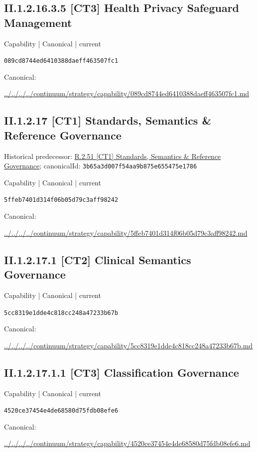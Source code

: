 \documentclass[10pt,a4paper]{article}
\begin{document}
\subsection*{II.1.2.16.3.5 [CT3] Health Privacy Safeguard Management}
\label{element-089cd8744ed6410388daeff463507fc1}
{\small Capability | Canonical | current}\par
\texttt{089cd8744ed6410388daeff463507fc1}\par
Canonical: \par
{\footnotesize\url{../../../../continuum/strategy/capability/089cd8744ed6410388daeff463507fc1.md}}\par
\subsection*{II.1.2.17 [CT1] Standards, Semantics \& Reference Governance}
Historical predecessor: \hyperref[element-3b65a3d007f54aa9b875e655475e1786]{R.2.51 [CT1] Standards, Semantics \& Reference Governance}; canonicalId: \texttt{3b65a3d007f54aa9b875e655475e1786}\par
\label{element-5ffeb7401d314f06b05d79c3aff98242}
{\small Capability | Canonical | current}\par
\texttt{5ffeb7401d314f06b05d79c3aff98242}\par
Canonical: \par
{\footnotesize\url{../../../../continuum/strategy/capability/5ffeb7401d314f06b05d79c3aff98242.md}}\par
\subsection*{II.1.2.17.1 [CT2] Clinical Semantics Governance}
\label{element-5cc8319e1dde4c818cc248a47233b67b}
{\small Capability | Canonical | current}\par
\texttt{5cc8319e1dde4c818cc248a47233b67b}\par
Canonical: \par
{\footnotesize\url{../../../../continuum/strategy/capability/5cc8319e1dde4c818cc248a47233b67b.md}}\par
\subsection*{II.1.2.17.1.1 [CT3] Classification Governance}
\label{element-4520ce37454e4de68580d75fdb08efe6}
{\small Capability | Canonical | current}\par
\texttt{4520ce37454e4de68580d75fdb08efe6}\par
Canonical: \par
{\footnotesize\url{../../../../continuum/strategy/capability/4520ce37454e4de68580d75fdb08efe6.md}}\par
\end{document}
